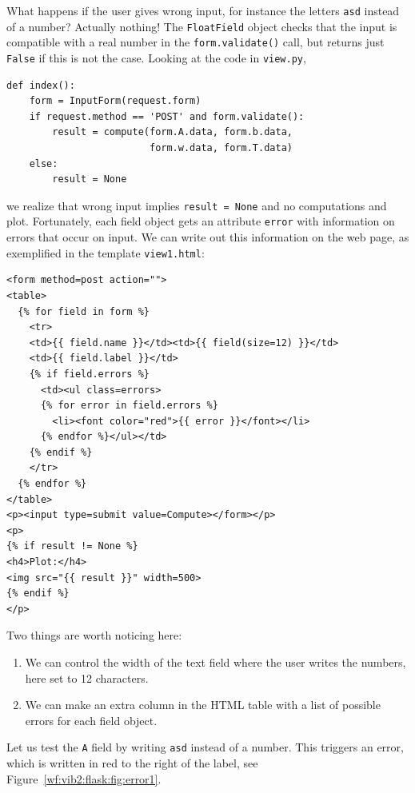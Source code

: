 \documentclass[%
oneside,                 %
final,                   %
10pt]{article}
\begin{document}

What happens if the user gives wrong input, for instance the letters \Verb!asd!
instead of a number? Actually nothing! The \Verb!FloatField! object
checks that the input is compatible with a real number in the
\Verb!form.validate()! call, but returns just \Verb!False! if this is not
the case. Looking at the code in \Verb!view.py!,

\begin{Verbatim}[numbers=none,fontsize=\fontsize{9pt}{9pt},baselinestretch=0.85]
def index():
    form = InputForm(request.form)
    if request.method == 'POST' and form.validate():
        result = compute(form.A.data, form.b.data,
                         form.w.data, form.T.data)
    else:
        result = None
\end{Verbatim}
we realize that wrong input implies \Verb!result = None! and no computations
and plot. Fortunately, each field object gets an attribute \Verb!error!
with information on errors that occur on input. We can write out
this information on the web page, as exemplified in the template
\Verb!view1.html!:

\begin{Verbatim}[numbers=none,fontsize=\fontsize{9pt}{9pt},baselinestretch=0.85]
<form method=post action="">
<table>
  {% for field in form %}
    <tr>
    <td>{{ field.name }}</td><td>{{ field(size=12) }}</td>
    <td>{{ field.label }}</td>
    {% if field.errors %}
      <td><ul class=errors>
      {% for error in field.errors %}
        <li><font color="red">{{ error }}</font></li>
      {% endfor %}</ul></td>
    {% endif %}
    </tr>
  {% endfor %}
</table>
<p><input type=submit value=Compute></form></p>
<p>
{% if result != None %}
<h4>Plot:</h4>
<img src="{{ result }}" width=500>
{% endif %}
</p>
\end{Verbatim}
Two things are worth noticing here:

\begin{enumerate}
\item We can control the width of the text field where the
   user writes the numbers, here set to 12 characters.

\item We can make an extra column in the HTML table with a list
   of possible errors for each field object.
\end{enumerate}

\noindent
Let us test the \Verb!A! field by writing \Verb!asd! instead of a number. This
triggers an error, which is written in red to the right of the label,
see Figure~\ref{wf:vib2:flask:fig:error1}.
\end{document}
